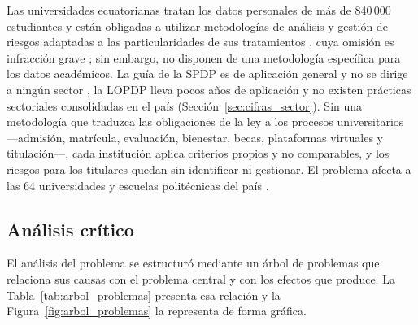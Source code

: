 Las universidades ecuatorianas tratan los datos personales de más de 840\,000 estudiantes \cite{sumba2025economia} y están obligadas a utilizar metodologías de análisis y gestión de riesgos adaptadas a las particularidades de sus tratamientos \cite[art.~47, num.~5]{lopdp2021}, cuya omisión es infracción grave \cite[art.~68]{lopdp2021}; sin embargo, no disponen de una metodología específica para los datos académicos. La guía de la SPDP es de aplicación general y no se dirige a ningún sector \cite{spdp2026guiav2}, la LOPDP lleva pocos años de aplicación y no existen prácticas sectoriales consolidadas en el país (Sección~\ref{sec:cifras_sector}). Sin una metodología que traduzca las obligaciones de la ley a los procesos universitarios ---admisión, matrícula, evaluación, bienestar, becas, plataformas virtuales y titulación---, cada institución aplica criterios propios y no comparables, y los riesgos para los titulares quedan sin identificar ni gestionar. El problema afecta a las 64 universidades y escuelas politécnicas del país \cite{ces2026estadisticas}.

\subsection{Análisis crítico}

El análisis del problema se estructuró mediante un árbol de problemas que relaciona sus causas con el problema central y con los efectos que produce. La Tabla~\ref{tab:arbol_problemas} presenta esa relación y la Figura~\ref{fig:arbol_problemas} la representa de forma gráfica.


